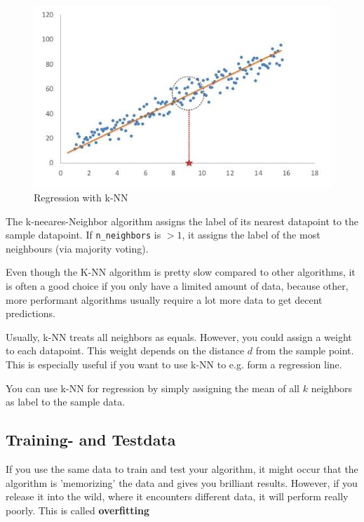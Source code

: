 \documentclass[a4paper, 11pt]{article}
\newcommand{\code}[1]{\texttt{#1}}
\begin{document}
\vspace{10px}

\begin{figure}
    \centering
    \includegraphics[keepaspectratio=true,height=12\baselineskip]{k-nn-regression.jpg}
    \caption{Regression with k-NN}
    \label{fig:knn-regression}
\end{figure}

The k-neeares-Neighbor algorithm assigns the label of its nearest datapoint to the sample datapoint. If \code{n\_neighbors} is $>1$, it assigns the label of the most neighbours (via majority voting).

\vspace{10px}

Even though the K-NN algorithm is pretty slow compared to other algorithms, it is often a good choice if you only have a limited amount of data, because other, more performant algorithms usually require a lot more data to get decent predictions.

Usually, k-NN treats all neighbors as equals. However, you could assign a weight to each datapoint. This weight depends on the distance $d$ from the sample point. This is especially useful if you want to use k-NN to e.g. form a regression line.

You can use k-NN for regression by simply assigning the mean of all $k$ neighbors as label to the sample data.

\subsection{Training- and Testdata}
If you use the same data to train and test your algorithm, it might occur that the algorithm is 'memorizing' the data and gives you brilliant results. However, if you release it into the wild, where it encounters different data, it will perform really poorly. This is called \textbf{overfitting}
\end{document}
